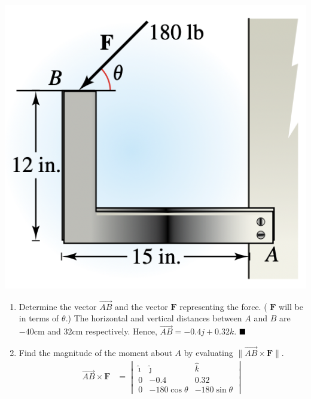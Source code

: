 \begin{enumerate}
\begin{center}
              \includegraphics[scale=0.55]{assets/larson11.4q29.png}
          \end{center}
          \begin{enumerate}[label={(\alph{*})}]
              \item Determine the vector $\overrightarrow{A B}$ and the vector $\mathbf{F}$
                    representing the force. ( $\mathbf{F}$ will be in terms of $\theta$.) \sol{}
                    The horizontal and vertical distances between $A$ and $B$ are $-40$cm and
                    $32$cm respectively. Hence, $\overrightarrow{A B} = -0.4j + 0.32k$.
                    $\hfill\blacksquare$ \newpage
              \item Find the magnitude of the moment about $A$ by evaluating $\|\overrightarrow{A
                            B} \times \mathbf{F}\|$. \sol{}
                    \begin{align*}
                        \overrightarrow{A B} \times \mathbf{F}        & = \begin{vmatrix}
                                                                              \hat{\imath} & \hat{\jmath}   & \hat{k}        \\
                                                                              0            & -0.4           & 0.32           \\
                                                                              0            & -180\cos\theta & -180\sin\theta

\end{vmatrix}
\end{align*}
\end{enumerate}
\end{enumerate}
